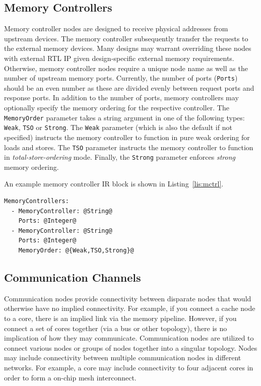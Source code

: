 \documentclass{article}
\begin{document}
\clearpage
\subsection{Memory Controllers}
\label{sec:MemCtrlNodes}

Memory controller nodes are designed to receive physical addresses from upstream devices.  The memory controller 
subsequently transfer the requests to the external memory devices.  Many designs may warrant overriding these nodes 
with external RTL IP given design-specific external memory requirements.  Otherwise, memory controller nodes require 
a unique node name as well as the number of upstream memory ports.  Currently, the number of ports (\texttt{Ports}) should be an even 
number as these are divided evenly between request ports and response ports.  In addition to the number of ports, 
memory controllers may optionally specify the memory ordering for the respective controller.  The \texttt{MemoryOrder} 
parameter takes a string argument in one of the following types: \texttt{Weak}, \texttt{TSO} or \texttt{Strong}.  
The \texttt{Weak} parameter (which is also the default if not specified) instructs the memory controller 
to function in pure weak ordering for loads and stores.  The \texttt{TSO} parameter instructs the memory 
controller to function in \textit{total-store-ordering} mode.  Finally, the \texttt{Strong} parameter 
enforces \textit{strong} memory ordering.

An example memory controller IR block is 
shown in Listing~\ref{lis:mctrl}.  

\vspace{0.125in}
\begin{lstlisting}[frame=single,style=base,caption={Memory Controller Node Definition},captionpos=b,label={lis:mctrl}]
MemoryControllers:
  - MemoryController: @String@
    Ports: @Integer@
  - MemoryController: @String@
    Ports: @Integer@
    MemoryOrder: @{Weak,TSO,Strong}@
\end{lstlisting}

\clearpage
\subsection{Communication Channels}
\label{sec:CommNodes}

Communication nodes provide connectivity between disparate nodes that would otherwise have no implied 
connectivity.  For example, if you connect a cache node to a core, there is an implied link via the memory pipeline.  However, 
if you connect a set of cores together (via a bus or other topology), there is no implication of how they may communicate.  
Communication nodes are utilized to connect various nodes or groups of nodes together into a singular topology.  Nodes may 
include connectivity between multiple communication nodes in different networks.  For example, a core may include connectivity 
to four adjacent cores in order to form a on-chip mesh interconnect.  
\end{document}
